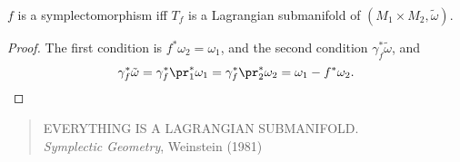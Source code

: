 \documentclass[a4paper]{article}
\begin{document}
\begin{prop}
  $f$ is a symplectomorphism iff $T_f$ is a Lagrangian submanifold of $(M_1 \times M_2, \tilde{\omega})$.
\end{prop}
\begin{proof}
  The first condition is $f^* \omega_2 = \omega_1$, and the second condition $\gamma_f^* \tilde{\omega}$, and
  \[
    \gamma_f^* \tilde{\omega} = \gamma_f^* \pr_1^* \omega_1 = \gamma_f^* \pr_2^* \omega_2 = \omega_1 - f^* \omega_2.\qedhere
  \]
\end{proof}

\begin{quote}
  EVERYTHING IS A LAGRANGIAN SUBMANIFOLD.\\
  \emph{Symplectic Geometry}, Weinstein (1981) %
\end{quote}
\end{document}
